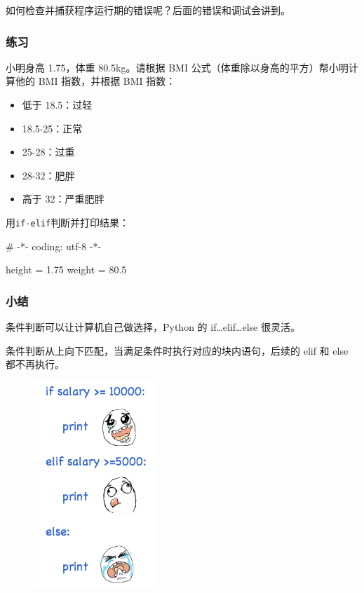 如何检查并捕获程序运行期的错误呢？后面的错误和调试会讲到。

\hypertarget{ux7ec3ux4e60}{%
\subsubsection{练习}\label{ux7ec3ux4e60}}

小明身高 1.75，体重 80.5kg。请根据 BMI
公式（体重除以身高的平方）帮小明计算他的 BMI 指数，并根据 BMI 指数：

\begin{itemize}
\item
  低于 18.5：过轻
\item
  18.5-25：正常
\item
  25-28：过重
\item
  28-32：肥胖
\item
  高于 32：严重肥胖
\end{itemize}

用\texttt{if-elif}判断并打印结果：

\begin{pythoncode}
# -*- coding: utf-8 -*-

height = 1.75
weight = 80.5
\end{pythoncode}

\hypertarget{ux5c0fux7ed3}{%
\subsubsection{小结}\label{ux5c0fux7ed3}}

条件判断可以让计算机自己做选择，Python 的 if\ldots elif\ldots else
很灵活。

条件判断从上向下匹配，当满足条件时执行对应的块内语句，后续的 elif 和
else 都不再执行。

 
 \begin{figure}[htp]
	\centering
	\includegraphics[width=0.6\linewidth]{fig/9240168310386880.png}
\end{figure}


